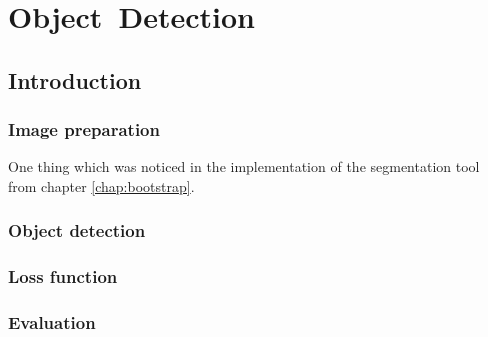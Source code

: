 \chapter{Object~Detection}
\label{chap:detection} 


\section{Introduction}


\subsection {Image preparation}

One thing which was noticed in the implementation of the segmentation tool from chapter \ref{chap:bootstrap}.






\subsection {Object detection}


\subsection {Loss function}

\subsection {Evaluation}






